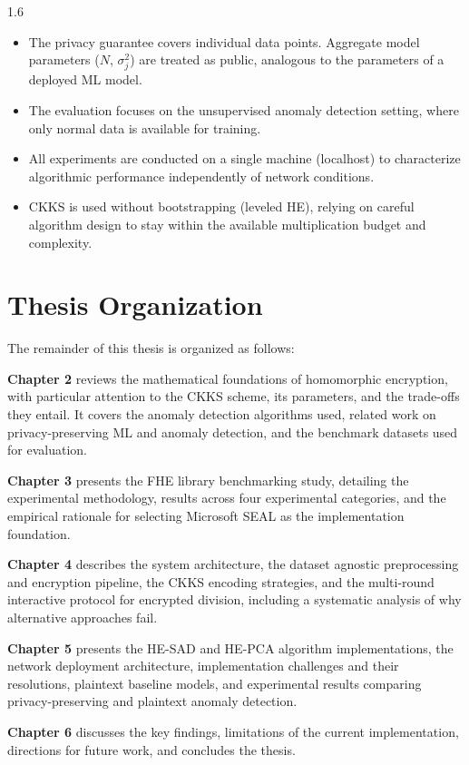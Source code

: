 \begin{spacing}{1.6}
\begin{itemize}
  \item The privacy guarantee covers individual data points. Aggregate model
  parameters ($N$, $\sigma^2_j$) are treated as public, analogous to the
  parameters of a deployed ML model.

  \item The evaluation focuses on the unsupervised anomaly detection setting,
  where only normal data is available for training.

  \item All experiments are conducted on a single machine (localhost) to
  characterize algorithmic performance independently of network conditions.

  \item CKKS is used without bootstrapping (leveled HE), relying on careful
  algorithm design to stay within the available multiplication budget and complexity.
\end{itemize}

\section{Thesis Organization}

The remainder of this thesis is organized as follows:

\textbf{Chapter 2} reviews the mathematical foundations of homomorphic
encryption, with particular attention to the CKKS scheme, its parameters, and
the trade-offs they entail. It covers the anomaly detection algorithms used,
related work on privacy-preserving ML and anomaly detection, and the benchmark
datasets used for evaluation.

\textbf{Chapter 3} presents the FHE library benchmarking study, detailing the
experimental methodology, results across four experimental categories, and the
empirical rationale for selecting Microsoft SEAL as the implementation
foundation.

\textbf{Chapter 4} describes the system architecture, the dataset agnostic
preprocessing and encryption pipeline, the CKKS encoding strategies, and the
multi-round interactive protocol for encrypted division, including a systematic
analysis of why alternative approaches fail.

\textbf{Chapter 5} presents the HE-SAD and HE-PCA algorithm implementations,
the network deployment architecture, implementation challenges and their
resolutions, plaintext baseline models, and experimental results comparing
privacy-preserving and plaintext anomaly detection.

\textbf{Chapter 6} discusses the key findings, limitations of the current
implementation, directions for future work, and concludes the thesis.

\end{spacing}
